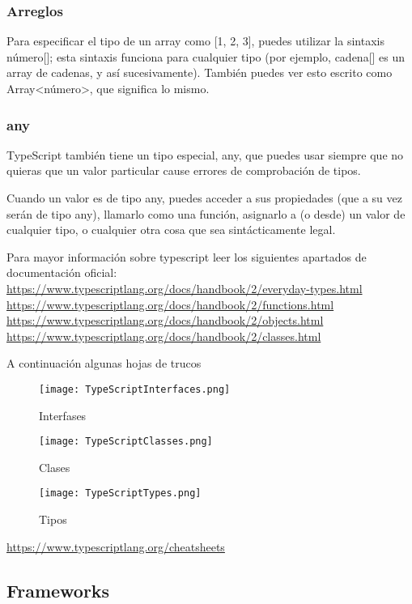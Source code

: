 \begin{enumerate}
\subsubsection{Arreglos}

Para especificar el tipo de un array como [1, 2, 3], puedes utilizar la sintaxis número[]; esta sintaxis funciona para cualquier tipo (por ejemplo, cadena[] es un array de cadenas, y así sucesivamente). También puedes ver esto escrito como Array<número>, que significa lo mismo.

\subsubsection{any}

TypeScript también tiene un tipo especial, any, que puedes usar siempre que no quieras que un valor particular cause errores de comprobación de tipos.

Cuando un valor es de tipo any, puedes acceder a sus propiedades (que a su vez serán de tipo any), llamarlo como una función, asignarlo a (o desde) un valor de cualquier tipo, o cualquier otra cosa que sea sintácticamente legal.

Para mayor información sobre typescript leer los siguientes apartados de documentación oficial:
\url{https://www.typescriptlang.org/docs/handbook/2/everyday-types.html}
\url{https://www.typescriptlang.org/docs/handbook/2/functions.html}
\url{https://www.typescriptlang.org/docs/handbook/2/objects.html}
\url{https://www.typescriptlang.org/docs/handbook/2/classes.html}

A continuación algunas hojas de trucos

\begin{figure}[H]
	\center
	\texttt{[image: TypeScriptInterfaces.png]}
	\caption{Interfases}
\end{figure}

\begin{figure}[H]
	\center
	\texttt{[image: TypeScriptClasses.png]}
	\caption{Clases}
\end{figure}

\begin{figure}[H]
	\center
	\texttt{[image: TypeScriptTypes.png]}
	\caption{Tipos}
\end{figure}

\url{https://www.typescriptlang.org/cheatsheets}

\subsection{Frameworks}


\end{enumerate}
